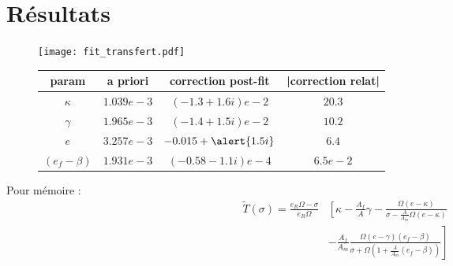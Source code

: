 \section{Résultats}

\begin{frame}
	
	\begin{figure}
	\centering
	\texttt{[image: fit\_transfert.pdf]}
	\end{figure}

\end{frame}

\begin{frame}
\begin{figure}
\begin{tabular}{cccc}
param & a priori & correction post-fit & |correction relat|\\
\hline
$\kappa$ & $1.039e-3$ & $(-1.3+1.6i)e-2$ & $20.3$ \\
$\gamma$ & $1.965e-3$ & $(-1.4+1.5i)e-2$ & $10.2$ \\
$e$ & $3.257e-3$ &$-0.015+\alert{1.5i}$  & $6.4$ \\
$(e_f-\beta)$ & $1.931e-3$ & $(-0.58-1.1i)e-4$ & $6.5e-2$ 
\end{tabular}
\end{figure}
Pour mémoire :
\begin{align*}
\tilde{T}(\sigma) 
     = \frac{e_R\Omega-\sigma}{e_R\Omega} &\left[ \kappa - \frac{A_f}{A}\gamma\right.- \frac{\Omega(e-\kappa)}{\sigma-\frac{A}{A_m}\Omega(e-\kappa)}\\
     &-\left. \frac{A_f}{A_m} \frac{\Omega (e-\gamma)(e_f-\beta)}{\sigma + \Omega(1+ \frac{A}{A_m}(e_f-\beta))}\right]
\end{align*}
\centering
   
    

\end{frame}